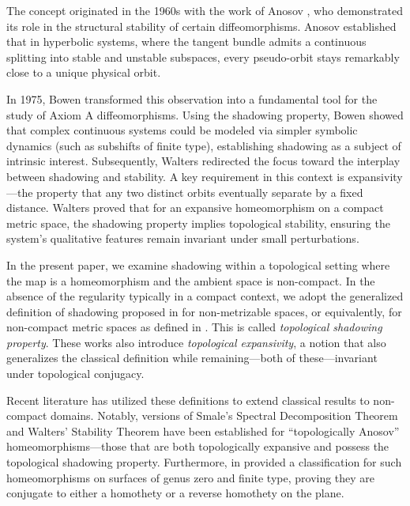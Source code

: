 \documentclass{amsart}
\begin{document}
The concept originated in the 1960s with the work of Anosov \cite{An67}, who demonstrated its role in the structural stability of certain diffeomorphisms. Anosov established that in hyperbolic systems, where the tangent bundle admits a continuous splitting into stable and unstable subspaces, every pseudo-orbit stays remarkably close to a unique physical orbit.

In 1975, Bowen \cite{Bo75} transformed this observation into a fundamental tool for the study of Axiom A diffeomorphisms. Using the shadowing property, Bowen showed that complex continuous systems could be modeled via simpler symbolic dynamics (such as subshifts of finite type), establishing shadowing as a subject of intrinsic interest. Subsequently, Walters \cite{Wa78} redirected the focus toward the interplay between shadowing and stability. A key requirement in this context is expansivity—the property that any two distinct orbits eventually separate by a fixed distance. Walters proved that for an expansive homeomorphism on a compact metric space, the shadowing property implies topological stability, ensuring the system's qualitative features remain invariant under small perturbations.




In the present paper, we examine shadowing within a topological setting where the map is a homeomorphism and the ambient space is non-compact. In the absence of the regularity typically in a compact context, we adopt the generalized definition of  shadowing proposed in \cite{DLRW13} for non-metrizable spaces, or equivalently,  for non-compact metric spaces as defined in \cite{LNY18}. This is called {\it topological shadowing property}. These works also introduce {\it topological expansivity}, a notion that also generalizes the classical definition while remaining—both of these—invariant under topological conjugacy.

Recent literature has utilized these definitions to extend classical results to non-compact domains. Notably, versions of Smale’s Spectral Decomposition Theorem and Walters’ Stability Theorem have been established for ``topologically Anosov'' homeomorphisms—those that are both topologically expansive and possess the topological shadowing property. Furthermore, in \cite{CGX21} provided a classification for such homeomorphisms on surfaces of genus zero and finite type, proving they are conjugate to either a homothety or a reverse homothety on the plane.
\end{document}
